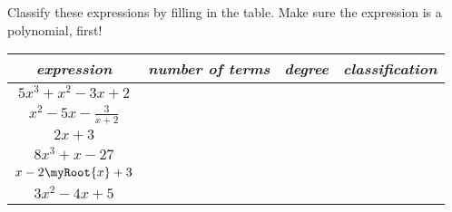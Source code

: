\begin{myProblemsWithContent}{1}{%
        Classify these expressions by filling in the table. 
        Make sure the expression is a polynomial, first!
        }
    \begin{tcolorbox}
    \begin{center}
    \large
    \begin{tabular}{c||c|c|c}
        {\bfseries\itshape expression} & {\bfseries\itshape number of terms} & {\bfseries\itshape degree} & {\bfseries\itshape classification} \\
        \midrule
        $5x^3 + x^2 - 3x + 2$          
            & \hspace{2em} & \hspace{2em}  & \hspace{2in} \\ \midrule
        $x^2 - 5x - {\frac{3}{x+2}}$ 
            & \hspace{2em} & \hspace{2em}  & \hspace{2in} \\ \midrule
        $2x + 3$ 
            & \hspace{2em} & \hspace{2em}  & \hspace{2in} \\ \midrule
        $8x^3 + x - 27$ 
            & \hspace{2em} & \hspace{2em}  & \hspace{2in} \\ \midrule
            $x - 2\myRoot{x} + 3$ 
            & \hspace{2em} & \hspace{2em}  & \hspace{2in} \\ \midrule
        $3x^2 - 4x + 5$ 
            & \hspace{2em} & \hspace{2em}  & \hspace{2in} \\
    \end{tabular}
    \end{center}
    \end{tcolorbox}
\end{myProblemsWithContent}
